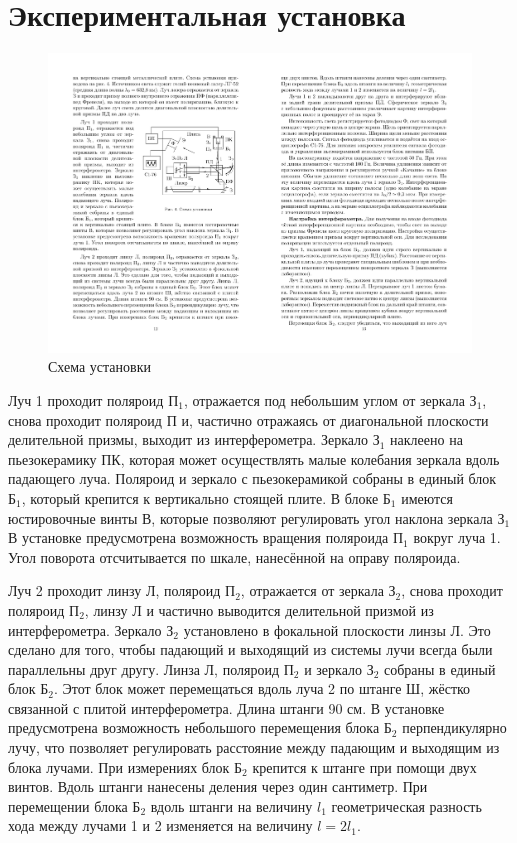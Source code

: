 \documentclass[a4paper,12pt]{article} %
\begin{document}
\section{Экспериментальная установка}
	\begin{figure}[H]
		\caption{Схема установки}
		\label{inst}
		\includegraphics[scale=1.5]{inst.pdf}
	\end{figure}
	Луч 1 проходит поляроид $П_1$, отражается под небольшим углом от зеркала $З_1$, снова проходит
	поляроид $П$ и, частично отражаясь от диагональной плоскости делительной призмы, выходит из интерферометра. Зеркало $З_1$ наклеено на пьезокерамику ПК, которая может осуществлять малые
	колебания зеркала вдоль падающего луча. Поляроид и зеркало с пьезокерамикой собраны в единый блок $Б_1$, который крепится к вертикально стоящей плите. В блоке $Б_1$ имеются юстировочные винты В, которые позволяют регулировать угол наклона зеркала $З_1$ В установке предусмотрена возможность вращения поляроида $П_1$ вокруг луча 1. Угол поворота отсчитывается по шкале, нанесённой на оправу поляроида.
	
	Луч 2 проходит линзу Л, поляроид $П_2$, отражается от зеркала $З_2$, снова проходит поляроид $П_2$, линзу Л и частично выводится делительной призмой из интерферометра. Зеркало $З_2$ установлено в фокальной плоскости линзы Л. Это сделано для того, чтобы падающий и выходящий из системы лучи всегда были параллельны друг другу. Линза Л, поляроид $П_2$ и зеркало $З_2$ собраны в единый блок $Б_2$. Этот блок может перемещаться вдоль луча 2 по штанге Ш, жёстко связанной с плитой интерферометра. Длина штанги 90 см. В установке предусмотрена возможность небольшого перемещения блока $Б_2$ перпендикулярно лучу, что позволяет регулировать расстояние между падающим и выходящим из блока лучами. При измерениях блок $Б_2$ крепится к штанге при помощи двух винтов. Вдоль штанги нанесены деления через один сантиметр. При перемещении блока $Б_2$ вдоль штанги на величину $ l_1 $ геометрическая разность хода между лучами 1 и 2 изменяется на величину $ l = 2l_1 $.
	
\end{document}

